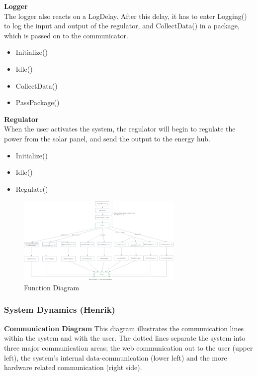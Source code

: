 \documentclass[12pt,a4paper]{report}
\begin{document}
\textbf{Logger}
\\The logger also reacts on a LogDelay. After this delay, it has to enter Logging() to log the input and output of the regulator, and CollectData() in a package, which is passed on to the communicator.

\begin{itemize}
\item Initialize()
\item Idle()
\item CollectData()
\item PassPackage()
\end{itemize}

\textbf{Regulator}\\
When the user activates the system, the regulator will begin to regulate the power from the solar panel, and send the output to the energy hub. 

\begin{itemize}
\item Initialize()
\item Idle()
\item Regulate()
\end{itemize}


\begin{figure}[htbp]
\centering
\includegraphics[width=8cm]{images/functiondiagram}
\caption{Function Diagram}
\label{fig:FunctionDiagram}
\end{figure}



\subsubsection{System Dynamics (Henrik)}
\textbf{Communication Diagram}
This diagram illustrates the communication lines within the system and with the user. The dotted lines separate the system into three major communication areas; the web communication out to the user (upper left), the system’s internal data-communication (lower left) and the more hardware related communication (right side).
\end{document}
